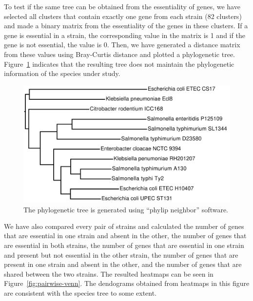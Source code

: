 \documentclass[a4paper,10pt, twocolumn]{article}
\begin{document}
To test if the same tree can be obtained from the essentiality of genes, we have selected all clusters that contain exactly one gene from each strain (82 clusters) and made a binary matrix from the essentiality of the genes in these clusters. If a gene is essential in a strain, the corresponding value in the matrix is 1 and if the gene  is not essential, the value is 0. Then, we have generated a distance matrix from these values using Bray-Curtis distance and plotted a phylogenetic tree.  Figure~\ref{fig:essentiality-tree} indicates that the resulting tree does not maintain the phylogenetic information of the species under study.

\begin{figure}
\includegraphics[scale=0.14]{make-essentiality-tree/essentiality-tree.pdf}
\caption{The phylogenetic tree is generated using ``phylip neighbor'' software.}
\label{fig:essentiality-tree}
\end{figure}

We have also compared every pair of strains and calculated the number of genes that are essential in one strain and absent in the other, the number of genes that are essential in both strains, the number of genes that are essential in one strain and present but not essential in the other strain, the number of genes that are present in one strain and absent in the other, and the number of genes that are shared between the two strains. The resulted heatmaps can be seen in Figure~\ref{fig:pairwise-venn}. The dendograms obtained from heatmaps in this figure are consistent with the species tree to some extent. 
\end{document}
